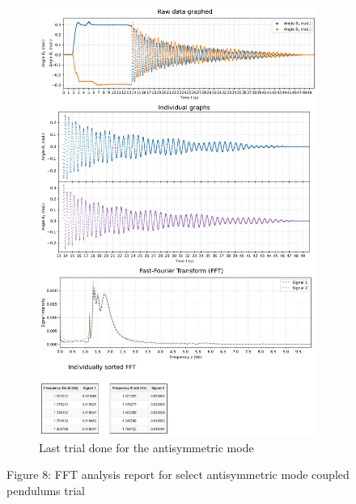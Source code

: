 \documentclass[12pt]{article}
\begin{document}
\begin{figure}[H]
\begin{subfigure}{0.49\linewidth}
        \includegraphics[width=0.98\linewidth]{figs/anti pendulum (right-back_3).png}
        \caption{Last trial done for the antisymmetric mode}
    \end{subfigure}
    \captionsetup{labelformat=empty} %
    \caption{Figure 8: FFT analysis report for select antisymmetric mode coupled pendulums trial}
\end{figure}
\end{document}
